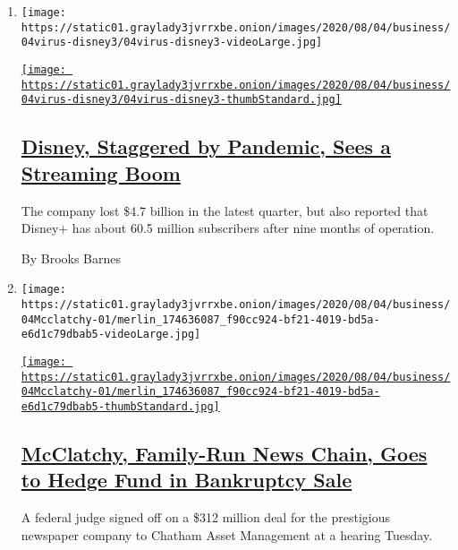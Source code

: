 \begin{enumerate}
\def\labelenumi{\arabic{enumi}.}
\item
  \texttt{[image: https://static01.graylady3jvrrxbe.onion/images/2020/08/04/business/04virus-disney3/04virus-disney3-videoLarge.jpg]}

  \href{/2020/08/04/business/media/disney-earnings-coronavirus.html}{\texttt{[image: https://static01.graylady3jvrrxbe.onion/images/2020/08/04/business/04virus-disney3/04virus-disney3-thumbStandard.jpg]}}

  \hypertarget{disney-staggered-by-pandemic-sees-a-streaming-boom}{%
  \subsection{\texorpdfstring{\href{/2020/08/04/business/media/disney-earnings-coronavirus.html}{Disney,
  Staggered by Pandemic, Sees a Streaming
  Boom}}{Disney, Staggered by Pandemic, Sees a Streaming Boom}}\label{disney-staggered-by-pandemic-sees-a-streaming-boom}}

  The company lost \$4.7 billion in the latest quarter, but also
  reported that Disney+ has about 60.5 million subscribers after nine
  months of operation.

  By Brooks Barnes
\item
  \texttt{[image: https://static01.graylady3jvrrxbe.onion/images/2020/08/04/business/04Mcclatchy-01/merlin\_174636087\_f90cc924-bf21-4019-bd5a-e6d1c79dbab5-videoLarge.jpg]}

  \href{/2020/08/04/business/media/mcclatchy-newspapers-bankrutpcy-chatham.html}{\texttt{[image: https://static01.graylady3jvrrxbe.onion/images/2020/08/04/business/04Mcclatchy-01/merlin\_174636087\_f90cc924-bf21-4019-bd5a-e6d1c79dbab5-thumbStandard.jpg]}}

  \hypertarget{mcclatchy-family-run-news-chain-goes-to-hedge-fund-in-bankruptcy-sale}{%
  \subsection{\texorpdfstring{\href{/2020/08/04/business/media/mcclatchy-newspapers-bankrutpcy-chatham.html}{McClatchy,
  Family-Run News Chain, Goes to Hedge Fund in Bankruptcy
  Sale}}{McClatchy, Family-Run News Chain, Goes to Hedge Fund in Bankruptcy Sale}}\label{mcclatchy-family-run-news-chain-goes-to-hedge-fund-in-bankruptcy-sale}}

  A federal judge signed off on a \$312 million deal for the prestigious
  newspaper company to Chatham Asset Management at a hearing Tuesday.


\end{enumerate}
